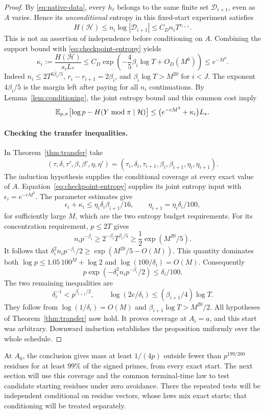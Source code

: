 \begin{proof}
By \eqref{eq:native-data}, every \(h_\ell\) belongs to the same finite
set \(\mathcal D_{i+1}\), even as \(A\) varies. Hence its
\emph{unconditional} entropy in this fixed-start experiment satisfies
\[
 H(\mathcal H)\le n_i\log|\mathcal D_{i+1}|
 \le C_Dn_i T^{r_{i+1}}.
\]
This is not an assertion of independence before conditioning on \(A\).
Combining the support bound with \eqref{eq:checkpoint-entropy} yields
\begin{equation}\label{eq:coverage-data-cost}
 \kappa_i:=\frac{H(\mathcal H)}{s_iL_*}
 \le C_D\exp\left(-\frac45\beta_i\log T+O_D(M^6)\right)
 \le e^{-M^3}.
\end{equation}
Indeed \(n_i\le2T^{6\beta_i/5}\),
\(r_i-r_{i+1}=2\beta_i\), and
\(\beta_i\log T>M^{20}\) for \(i<J\).
The exponent \(4\beta_i/5\) is the margin left after paying for all
\(n_i\) continuations. By Lemma~\ref{lem:conditioning}, the joint
entropy bound and this common cost imply
\begin{equation}\label{eq:coverage-conditional-deficit}
 \mathbb E_{p,\pi}\bigl[\log p-H(Y\bmod\pi\mid\mathcal H)\bigr]
 \le \bigl(e^{-cM^3}+\kappa_i\bigr)L_*.
\end{equation}

\paragraph{Checking the transfer inequalities.}
In Theorem~\ref{thm:transfer} take
\[
 (\tau,\delta,\tau',\beta,\beta',\eta,\eta')
 =(\tau_i,\delta_i,\tau_{i+1},\beta_i,\beta_{i+1},
   \eta_i,\eta_{i+1}).
\]
The induction hypothesis supplies the conditional coverage at every
exact value of \(A\). Equation~\eqref{eq:checkpoint-entropy} supplies
its joint entropy input with \(\epsilon_i=e^{-cM^3}\).
The parameter estimates give
\[
 \epsilon_i+\kappa_i
 \le \eta_i\delta_i\beta_{i+1}/16,
 \qquad \eta_{i+1}=\eta_i\delta_i/100,
\]
for sufficiently large \(M\), which are the two entropy budget
requirements. For its concentration requirement, \(p\le2T\) gives
\[
 n_i p^{-\beta_i}
 \ge2^{-\beta_i}T^{\beta_i/5}
 \ge\frac12\exp(M^{20}/5).
\]
It follows that
\(\delta_i^2n_i p^{-\beta_i}/2\ge
\exp(M^{20}/5-O(M))\).
This quantity dominates both
\(\log p\le1.05\,100^M+\log2\) and
\(\log(100/\delta_i)=O(M)\). Consequently
\[
 p\exp(-\delta_i^2n_i p^{-\beta_i}/2)\le\delta_i/100.
\]
The two remaining inequalities are
\[
 \delta_i^{-1}<p^{\beta_{i+1}/2},\qquad
 \log(2e/\delta_i)\le(\beta_{i+1}/4)\log T.
\]
They follow from \(\log(1/\delta_i)=O(M)\) and
\(\beta_{i+1}\log T>M^{20}/2\).
All hypotheses of Theorem~\ref{thm:transfer} now hold. It proves
coverage at \(A_i=a\), and this start was arbitrary. Downward induction
establishes the proposition uniformly over the whole schedule.
\end{proof}

At \(A_0\), the conclusion gives mass at least \(1/(4p)\) outside
fewer than \(p^{199/200}\) residues for at least \(99\%\) of the signed
primes, from every exact start. The next section will use this coverage
and the common terminal-time law to test candidate starting residues
under zero avoidance. There the repeated tests will be independent
conditional on residue vectors, whose laws mix exact starts; that
conditioning will be treated separately.
